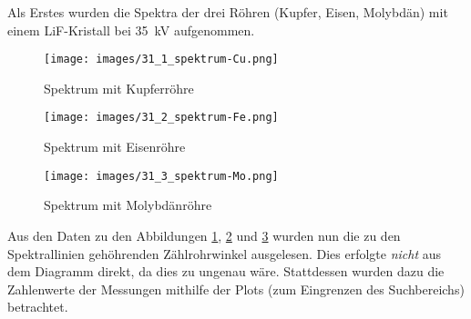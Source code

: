 Als Erstes wurden die Spektra der drei R\"ohren (Kupfer, Eisen, Molybd\"an) mit
einem LiF-Kristall bei \SI{35}{\kilo\volt} aufgenommen.

\begin{figure}[h!]
    \centering
    \texttt{[image: images/31\_1\_spektrum-Cu.png]}
    \caption{Spektrum mit Kupferr\"ohre}
    \label{fig:spektrum:cu}
\end{figure}

\begin{figure}[h!]
    \centering
    \texttt{[image: images/31\_2\_spektrum-Fe.png]}
    \caption{Spektrum mit Eisenr\"ohre}
    \label{fig:spektrum:fe}
\end{figure}

\begin{figure}[h!]
    \centering
    \texttt{[image: images/31\_3\_spektrum-Mo.png]}
    \caption{Spektrum mit Molybd\"anr\"ohre}
    \label{fig:spektrum:mo}
\end{figure}

Aus den Daten zu  den Abbildungen \ref{fig:spektrum:cu}, \ref{fig:spektrum:fe}
und \ref{fig:spektrum:mo}  wurden nun die zu  den Spektrallinien geh\"ohrenden
Z\"ahlrohrwinkel  ausgelesen. Dies  erfolgte  \emph{nicht}  aus  dem  Diagramm
direkt, da dies zu ungenau w\"are. Stattdessen wurden dazu die Zahlenwerte der
Messungen mithilfe der Plots (zum Eingrenzen des Suchbereichs) betrachtet.


